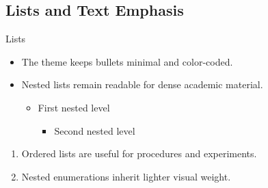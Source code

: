 \documentclass[8pt]{beamer}
\begin{document}
\subsection{Lists and Text Emphasis}

\begin{frame}{\insertsection}{\insertsubsection}

    \begin{block}{Lists}
        \begin{itemize}
            \item The theme keeps bullets minimal and color-coded.
            \item Nested lists remain readable for dense academic material.
            \begin{itemize}
                \item First nested level
                \begin{itemize}
                    \item Second nested level
                \end{itemize}
            \end{itemize}
        \end{itemize}

        \begin{enumerate}
            \item Ordered lists are useful for procedures and experiments.
            \item Nested enumerations inherit lighter visual weight.
        \end{enumerate}
    \end{block}

\end{frame}
\end{document}
